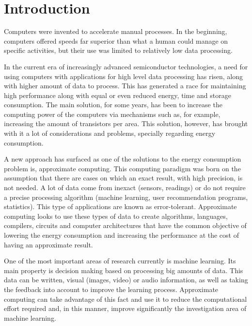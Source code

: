 
\chapter{Introduction}
\label{chp:intro}

Computers were invented to accelerate manual processes. In the beginning, computers
offered speeds far superior than what a human could manage on specific activities, but their use
was limited to relatively low data processing. 

In the current era of increasingly advanced semiconductor technologies, a need for using computers 
with applications for high level data processing has risen, along with higher amount of data to process.
This has generated a race for maintaining high performance along with equal or even reduced 
energy, time and storage consumption. The main solution, for some years, has been to increase the 
computing power of the computers via mechanisms such as, for example, increasing the amount of transistors
per area. This solution, however, has brought with it a lot of considerations and problems, specially 
regarding energy consumption.

A new approach has surfaced as one of the solutions to the energy consumption problem is, approximate computing.
This computing paradigm was born on the assumption that there are cases on which an exact result, with high precision,
is not needed. A lot of data come from inexact (sensors, readings) or do not require a precise processing
algorithm (machine learning, user recommendation programs, statistics). This type of applications are
known as error-tolerant. Approximate computing looks to use these types of data to create algorithms,
languages, compilers, circuits and computer architectures that have the common objective of lowering
the energy consumption and increasing the performance at the cost of having an approximate result.

One of the most important areas of research currently is machine learning. Its main property is
decision making based on processing big amounts of data. This data can be written, visual (images, video) or 
audio information, as well as taking the feedback into account to improve the learning process.
Approximate computing can take advantage of this fact and use it to reduce the computational effort
required and, in this manner, improve significantly the investigation area of machine learning.

